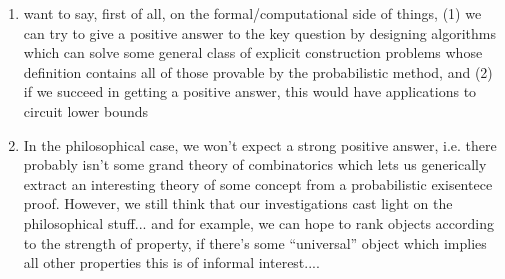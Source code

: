 \begin{enumerate}
    \item want to say, first of all, on the formal/computational side of things, (1) we can try to give a positive answer to the key question by designing algorithms which can solve some general class of explicit construction problems whose definition contains all of those provable by the probabilistic method, and (2) if we succeed in getting a positive answer, this would have applications to circuit lower bounds
    \item In the philosophical case, we won't expect a strong positive answer, i.e. there probably isn't some grand theory of combinatorics which lets us generically extract an interesting theory of some concept from a probabilistic exisentece proof. However, we still think that our investigations cast light on the philosophical stuff... and for example, we can hope to rank objects according to the strength of property, if there's some ``universal'' object which implies all other properties this is of informal interest....
\end{enumerate}



